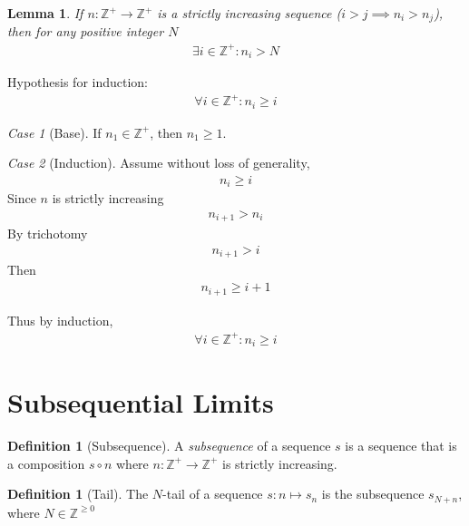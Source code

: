 \documentclass{amsart}
\numberwithin{equation}{section}
\let\oldendproof\endproof
\renewenvironment{proof}[1][\proofname]{%
  \setcounter{case}{0}
  \setcounter{step}{0}
  \oldproof[#1]%
}{\oldendproof}
\theoremstyle{plain}
\newtheorem{lemma}[theorem]{Lemma}
\theoremstyle{definition}
\newtheorem{definition}[theorem]{Definition}
\theoremstyle{remark}
\newtheorem{case}{Case}
\begin{document}
\begin{lemma}
  If $n:\mathbb{Z}^+\to \mathbb{Z}^+$ is a strictly increasing sequence ($i>j\implies n_i> n_j$), then for any positive integer $N$ 
  \begin{align}
    \exists i \in \mathbb{Z}^+: n_i > N
  \end{align}
\end{lemma}
\begin{proof}
  Hypothesis for induction:
  \begin{align}
    \forall i \in \mathbb{Z}^+: n_i \geq i
  \end{align}
  \begin{case}[Base]
    If $n_1\in\mathbb{Z}^+$, then $n_1 \geq 1$.
  \end{case}
  \begin{case}[Induction]
    Assume without loss of generality,
    \begin{align}
      n_i \geq i
    \end{align}
    Since $n$ is strictly increasing
    \begin{align}
      n_{i+1} > n_i
    \end{align}
    By trichotomy
    \begin{align}
      n_{i+1} > i
    \end{align}
    Then
    \begin{align}
      n_{i+1} \geq i+1
    \end{align}
  \end{case}
  Thus by induction, 
  \begin{align}
    \forall i \in \mathbb{Z}^+: n_i \geq i
  \end{align}
\end{proof}



\section{Subsequential Limits}

\begin{definition}[Subsequence]
  A \emph{subsequence} of a sequence $s$ is a sequence that is a composition $s \circ n$ where $n:\mathbb{Z}^+\to \mathbb{Z}^+$ is strictly increasing.
\end{definition}

\begin{definition}[Tail]
  The $N$-tail of a sequence $s:n\mapsto s_n$ is the subsequence $s_{N+n}$, where $N\in\mathbb{Z}^{\geq 0}$
\end{definition}
\end{document}
